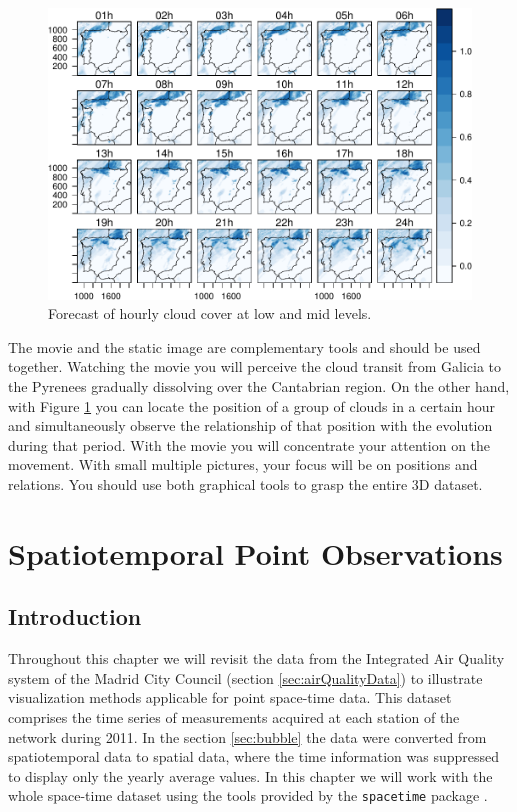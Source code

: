 \documentclass[smallroyalvopaper]{memoir}
\begin{document}
\begin{figure}[htb]
\centering
\includegraphics[width=.9\linewidth]{figs/cft.pdf}
\caption{\label{fig:cft}Forecast of hourly cloud cover at low and mid levels.}
\end{figure}

The movie and the static image are complementary tools and should be
used together. Watching the movie you will perceive the cloud transit
from Galicia to the Pyrenees gradually dissolving over the Cantabrian
region. On the other hand, with Figure \ref{fig:cft} you can locate the
position of a group of clouds in a certain hour and simultaneously
observe the relationship of that position with the evolution during
that period. With the movie you will concentrate your attention on the
movement. With small multiple pictures, your focus will be on
positions and relations. You should use both graphical tools to grasp
the entire 3D dataset.

\chapter{Spatiotemporal Point Observations}
\label{sec:orgheadline45}
\label{cha:pointsST}

\section{Introduction}
\label{sec-1}
Throughout this chapter we will revisit the data from the Integrated
Air Quality system of the Madrid City Council (section
\ref{sec:airQualityData}) to illustrate visualization methods
applicable for point space-time data. This dataset comprises the time
series of measurements acquired at each station of the network
during 2011. In the section \ref{sec:bubble} the data were converted
from spatiotemporal data to spatial data, where the time
information was suppressed to display only the yearly average
values. In this chapter we will work with the whole space-time dataset
using the tools provided by the \texttt{spacetime} package
\cite{Pebesma2012}.
\end{document}
